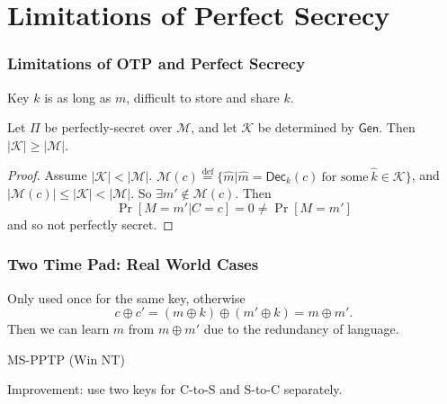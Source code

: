 \section{Limitations of Perfect Secrecy}
\begin{frame}\frametitle{Limitations of OTP and Perfect Secrecy}
Key $k$ is as long as $m$, difficult to store and share $k$.
\begin{theorem}
Let $\Pi$ be perfectly-secret over $\mathcal{M}$, and let $\mathcal{K}$ be determined by $\mathsf{Gen}$. Then $|\mathcal{K}|\ge |\mathcal{M}|$. 
\end{theorem}
\begin{proof}
Assume $|\mathcal{K}| < |\mathcal{M}|$.
$\mathcal{M}(c) \overset{\text{def}}{=} \{ \hat{m} | \hat{m} = \mathsf{Dec}_k(c)\  \text{for some}\ \hat{k} \in \mathcal{K} \}$, and $|\mathcal{M}(c)|\le |\mathcal{K}| < |\mathcal{M}|$. So $\exists m' \notin \mathcal{M}(c)$. Then
\[ \Pr[M=m'|C=c] = 0 \neq \Pr[M = m'] \]
and so not perfectly secret.
\end{proof}
\end{frame}
\begin{frame}\frametitle{Two Time Pad: Real World Cases}
Only used once for the same key, otherwise
\[c\oplus c'=(m\oplus k)\oplus (m'\oplus k)=m\oplus m'.\]
Then we can learn $m$ from $m\oplus m'$ due to the redundancy of language.
\begin{exampleblock}{MS-PPTP (Win NT)}
\begin{figure}
\begin{center}

\end{center}
\end{figure}
Improvement: use two keys for C-to-S and S-to-C separately.
\end{exampleblock}
\end{frame}
